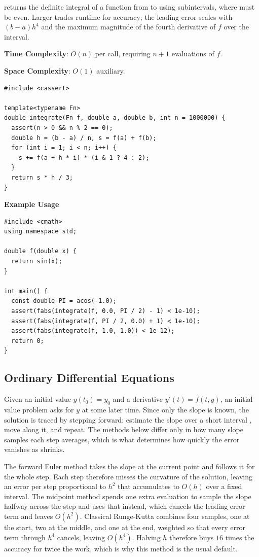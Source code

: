 \begin{compactitem}
  \item {} returns the definite integral of a function  from  to  using  subintervals, where  must be even. Larger  trades runtime for accuracy; the leading error scales with $(b - a)h^4$ and the maximum magnitude of the fourth derivative of $f$ over the interval.
\end{compactitem}

\textbf{Time Complexity}: $O(n)$ per call, requiring $n + 1$ evaluations of $f$.

\textbf{Space Complexity}: $O(1)$ auxiliary.

\begin{lstlisting}[style=cpp]
#include <cassert>

template<typename Fn>
double integrate(Fn f, double a, double b, int n = 1000000) {
  assert(n > 0 && n % 2 == 0);
  double h = (b - a) / n, s = f(a) + f(b);
  for (int i = 1; i < n; i++) {
    s += f(a + h * i) * (i & 1 ? 4 : 2);
  }
  return s * h / 3;
}
\end{lstlisting}
\textbf{Example Usage}\par
\begin{lstlisting}[style=cpp]
#include <cmath>
using namespace std;

double f(double x) {
  return sin(x);
}

int main() {
  const double PI = acos(-1.0);
  assert(fabs(integrate(f, 0.0, PI / 2) - 1) < 1e-10);
  assert(fabs(integrate(f, PI / 2, 0.0) + 1) < 1e-10);
  assert(fabs(integrate(f, 1.0, 1.0)) < 1e-12);
  return 0;
}
\end{lstlisting}
\subsection{Ordinary Differential Equations}
\label{sec:5.4.7}
Given an initial value $y(t_0) = y_0$ and a derivative $y'(t) = f(t, y)$, an initial value problem asks for $y$ at some later time. Since only the slope is known, the solution is traced by stepping forward: estimate the slope over a short interval , move along it, and repeat. The methods below differ only in how many slope samples each step averages, which is what determines how quickly the error vanishes as  shrinks.

The forward Euler method takes the slope at the current point and follows it for the whole step. Each step therefore misses the curvature of the solution, leaving an error per step proportional to $h^2$ that accumulates to $O(h)$ over a fixed interval. The midpoint method spends one extra evaluation to sample the slope halfway across the step and uses that instead, which cancels the leading error term and leaves $O(h^{2})$. Classical Runge-Kutta combines four samples, one at the start, two at the middle, and one at the end, weighted so that every error term through $h^4$ cancels, leaving $O(h^{4})$. Halving $h$ therefore buys $16$ times the accuracy for twice the work, which is why this method is the usual default.

